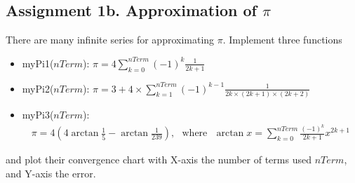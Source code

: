 \documentclass[12pt,a4paper,hidelinks,fleqn]{article}            %
\begin{document}
\subsection*{Assignment 1b. Approximation of $\pi$}
There are many infinite series for approximating $\pi$.
Implement three functions 
\begin{itemize}
\item myPi1($nTerm$): $\displaystyle \pi = 4 \sum_{k=0}^{nTerm} (-1)^{k}\frac{1}{2k+1}$
\item myPi2($nTerm$): $\displaystyle \pi = 3 + 4 \times \sum_{k=1}^{nTerm}(-1)^{k-1}\frac{1}{2k \times (2k+1) \times (2k+2)}$
\item myPi3($nTerm$): 
\begin{align*}
\pi = 4(4\arctan \frac{1}{5} - \arctan \frac{1}{239}), ~~~\text{where} 
~~~\arctan x = \sum_{k=0}^{nTerm} \frac{(-1)^k} {2k+1} x^{2k+1}
\end{align*}
\end{itemize}
and plot their convergence chart with X-axis the number of terms used $nTerm$, and Y-axis the error.
\end{document}
